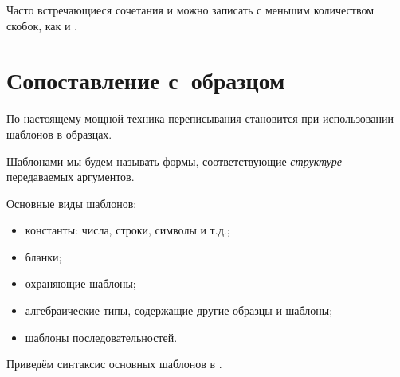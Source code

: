 Часто встречающиеся сочетания  и  можно записать с меньшим количеством скобок, как  и .

\section[4]{Сопоставление с~образцом}%
По-настоящему мощной техника переписывания становится при использовании шаблонов в образцах.

Шаблонами мы будем называть формы, соответствующие \emph{структуре} передаваемых аргументов. 

Основные виды шаблонов:
  \begin{itemize}
    \item константы: числа, строки, символы и т.д.;
    \item бланки;
    \item охраняющие шаблоны;
    \item алгебраические типы, содержащие другие образцы и шаблоны;
    \item шаблоны последовательностей.
  \end{itemize}

Приведём синтаксис основных шаблонов в .

